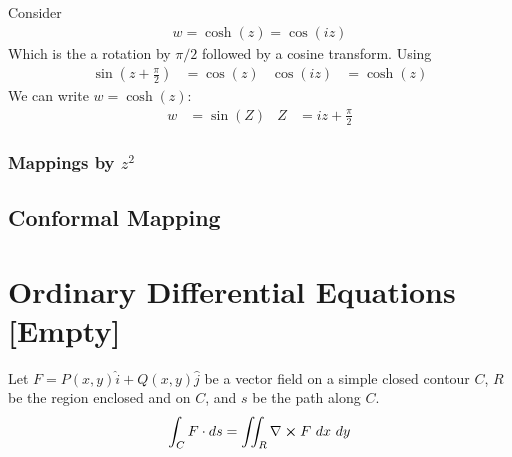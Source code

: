 \documentclass[12pt, english]{book}
\begin{document}
	\begin{example}
		Consider
		\begin{align*}
			w = \cosh(z) = \cos(iz)
		\end{align*}
		Which is the a rotation by \(\pi /2 \) followed by a cosine transform.
		Using
		\begin{align*}
			\sin(z + \frac{\pi}{2}) &= \cos(z) & \cos(iz) &= \cosh(z)
		\end{align*}
		We can write \(w = \cosh(z)\):
		\begin{align*}
			w &= \sin(Z) & Z &= iz + \frac{\pi}{2}
		\end{align*}
	\end{example}
	
	\section{Mappings by \texorpdfstring{\(z^2\)}{TEXT}} \label{Mappings by z^2 Section - Complex}
	
	
	
	
	
	
	
	
	
	
	
	
	
	
	
	
	
	
	
	
	
	
	
	
	
	
	
	
	
	
	
	
	
	
	
	
	
	\chapter{Conformal Mapping} \label{Conformal Mapping Chapter - Complex}
	
	
	
	
	\part{Ordinary Differential Equations [Empty]} \label{Ordinary Differential Equations Part}
	
	\begin{theorem}
		\label{Green's Theorem - ODE}
		Let \(F = P(x,y) \hat{i} + Q(x,y) \hat{j}\) be a vector field on a simple closed contour \(C\), \(R\) be the region enclosed and on \(C\), and \(s\) be the path along \(C\).
		\begin{align*}
			\int_C F \cdot ds = \iint_R \nabla \cross F \ dx \ dy
		\end{align*}
	\end{theorem}
	
\end{document}
